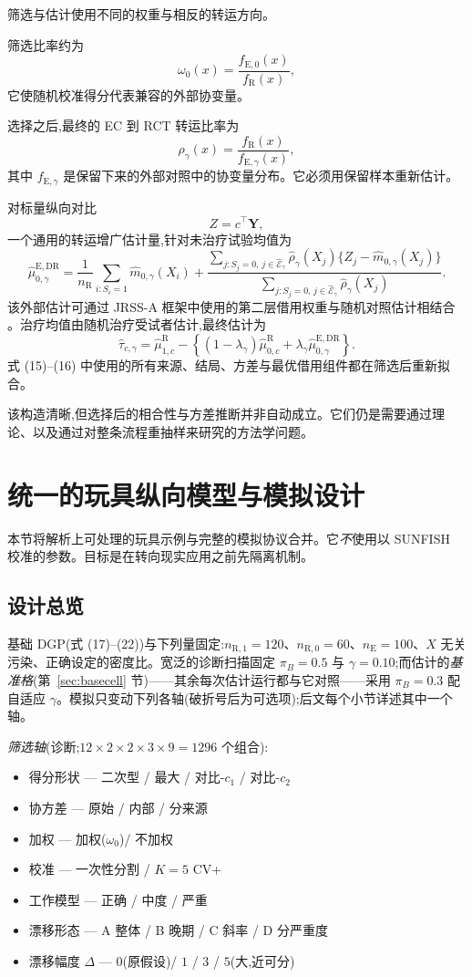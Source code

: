 \documentclass[11pt]{article}
\newcommand{\R}{\mathrm{R}}
\newcommand{\E}{\mathrm{E}}
\begin{document}
筛选与估计使用不同的权重与相反的转运方向。

筛选比率约为
\[
\omega_0(x)=\frac{f_{\E,0}(x)}{f_{\R}(x)},
\]
它使随机校准得分代表兼容的外部协变量。

选择之后,最终的 EC 到 RCT 转运比率为
\[
\rho_{\gamma}(x)
=
\frac{f_{\R}(x)}{f_{\E,\gamma}(x)},
\]
其中 $f_{\E,\gamma}$ 是保留下来的外部对照中的协变量分布。它必须用保留样本重新估计。

对标量纵向对比
\[
Z=c^{\top}\bm Y,
\]
一个通用的转运增广估计量,针对未治疗试验均值为
\[
\widehat\mu_{0,\gamma}^{\E,\mathrm{DR}}
=
\frac{1}{n_{\R}}\sum_{i:S_i=1}\widehat m_{0,\gamma}(X_i)
+
\frac{
\sum_{j:S_j=0,\,j\in\widehat{\mathcal E}_{\gamma}}
\widehat\rho_{\gamma}(X_j)
\{Z_j-\widehat m_{0,\gamma}(X_j)\}
}
{
\sum_{j:S_j=0,\,j\in\widehat{\mathcal E}_{\gamma}}
\widehat\rho_{\gamma}(X_j)
}.
\tag{15}
\]
该外部估计可通过 JRSS-A 框架中使用的第二层借用权重与随机对照估计相结合 \citep{zhou2025causal}。治疗均值由随机治疗受试者估计,最终估计为
\[
\widehat\tau_{c,\gamma}
=
\widehat\mu_{1,c}^{\R}
-
\left\{(1-\lambda_\gamma)\widehat\mu_{0,c}^{\R}
+\lambda_\gamma\widehat\mu_{0,\gamma}^{\E,\mathrm{DR}}\right\}.
\tag{16}
\]
式 (15)--(16) 中使用的所有来源、结局、方差与最优借用组件都在筛选后重新拟合。

该构造清晰,但选择后的相合性与方差推断并非自动成立。它们仍是需要通过理论、以及通过对整条流程重抽样来研究的方法学问题。

\section{统一的玩具纵向模型与模拟设计}

本节将解析上可处理的玩具示例与完整的模拟协议合并。它\emph{不}使用以 SUNFISH 校准的参数。目标是在转向现实应用之前先隔离机制。

\subsection{设计总览}

基础 DGP(式 (17)--(22))与下列量固定:$n_{\R,1}=120$、$n_{\R,0}=60$、$n_{\E}=100$、$X$ 无关污染、正确设定的密度比。宽泛的诊断扫描固定 $\pi_B=0.5$ 与 $\gamma=0.10$;而估计的\emph{基准格}(第~\ref{sec:basecell} 节)——其余每次估计运行都与它对照——采用 $\pi_B=0.3$ 配自适应 $\gamma$。模拟只变动下列各轴(破折号后为可选项);后文每个小节详述其中一个轴。

\emph{筛选轴}(诊断;$12\times2\times2\times3\times9=1296$ 个组合):
\begin{itemize}
    \item 得分形状 --- 二次型 / 最大 / 对比-$c_1$ / 对比-$c_2$
    \item 协方差 --- 原始 / 内部 / 分来源
    \item 加权 --- 加权($\omega_0$)/ 不加权
    \item 校准 --- 一次性分割 / $K{=}5$ CV+
    \item 工作模型 --- 正确 / 中度 / 严重
    \item 漂移形态 --- A 整体 / B 晚期 / C 斜率 / D 分严重度
    \item 漂移幅度 $\Delta$ --- $0$(原假设)/ $1$ / $3$ / $5$(大,近可分)
\end{itemize}
\end{document}
